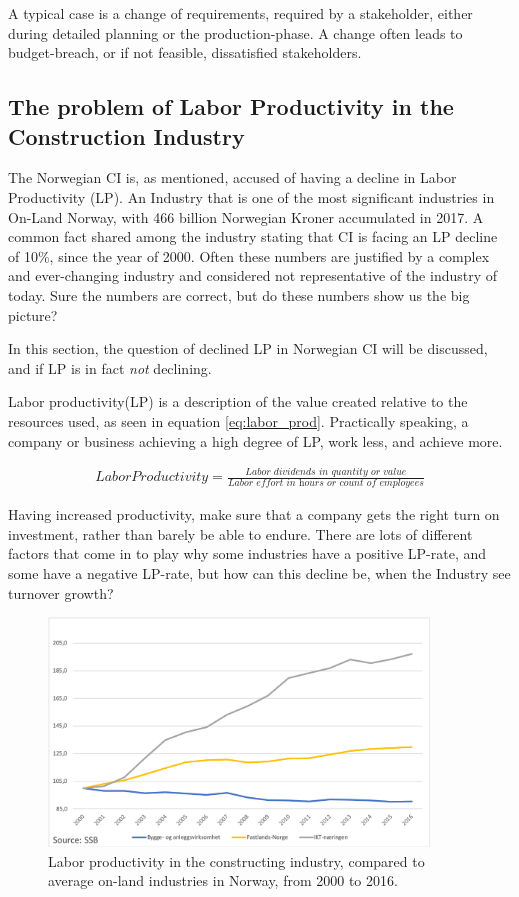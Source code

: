 A typical case is a change of requirements, required by a stakeholder, either during detailed planning or the production-phase. A change often leads to budget-breach, or if not feasible, dissatisfied stakeholders. 

\subsection{The problem of Labor Productivity in the Construction Industry}
The Norwegian CI is, as mentioned, accused of having a decline in Labor Productivity (LP). An Industry that is one of the most significant industries in On-Land Norway, with 466 billion Norwegian Kroner accumulated in 2017. A common fact shared among the industry stating that CI is facing an LP decline of 10\%, since the year of 2000. Often these numbers are justified by a complex and ever-changing industry and considered not representative of the industry of today. Sure the numbers are correct, but do these numbers show us the big picture?

In this section, the question of declined LP in Norwegian CI will be discussed, and if LP is in fact \textit{not} declining.

Labor productivity(LP) is a description of the value created relative to the resources used, as seen in equation \ref{eq:labor_prod}. Practically speaking, a company or business achieving a high degree of LP, work less, and achieve more. 

\begin{eqnarray}\label{eq:labor_prod}
Labor Productivity = \frac{\textit{Labor dividends in quantity or value}}{\textit{Labor effort in hours or count of employees}} 
\end{eqnarray}

Having increased productivity, make sure that a company gets the right turn on investment, rather than barely be able to endure. There are lots of different factors that come in to play why some industries have a positive LP-rate, and some have a negative LP-rate, but how can this decline be, when the Industry see turnover growth?

\begin{figure}
    \centering
    \includegraphics[width=0.9\textwidth]{fig/ba_on-land_ICT.png}
    \caption{Labor productivity in the constructing industry, compared to average on-land industries in Norway, from 2000 to 2016.}
    \label{fig:productivity-comparing}
\end{figure}

